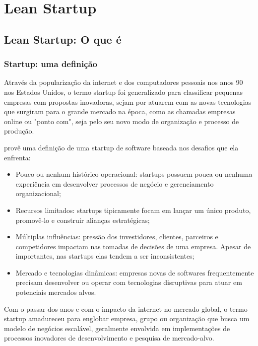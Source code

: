 \chapter{Lean Startup}
\label{cap:leanstartup}
\section{Lean Startup: O que é}
\subsection{Startup: uma definição}
\par Através da popularização da internet e dos computadores pessoais nos anos 90 nos Estados Unidos, o termo startup foi generalizado para classificar pequenas empresas com propostas inovadoras, sejam por atuarem com as novas tecnologias que surgiram para o grande mercado na época, como as chamadas empresas online ou "ponto com", seja pelo seu novo modo de organização e processo de produção.
\par \cite{nicolo:14} provê uma definição de uma startup de software baseada nos desafios que ela enfrenta:
\begin{itemize}
\item Pouco ou nenhum histórico operacional: startups possuem pouca ou nenhuma experiência em desenvolver processos de negócio e gerenciamento organizacional;	
\item Recursos limitados: startups tipicamente focam em lançar um único produto, promovê-lo e construir alianças estratégicas;
\item Múltiplas influências: pressão dos investidores, clientes, parceiros e competidores impactam nas tomadas de decisões de uma empresa. Apesar de importantes, nas startups elas tendem a ser inconsistentes;
\item Mercado e tecnologias dinâmicas: empresas novas de softwares frequentemente precisam desenvolver ou operar com tecnologias disruptivas para atuar em potenciais mercados alvos.
\end{itemize}

\par Com o passar dos anos e com o impacto da internet no mercado global, o termo startup amadureceu para englobar empresa, grupo ou organização que busca um modelo de negócios escalável, geralmente envolvida em implementações de processos inovadores de desenvolvimento e pesquisa de mercado-alvo. \citep{blank:03}

